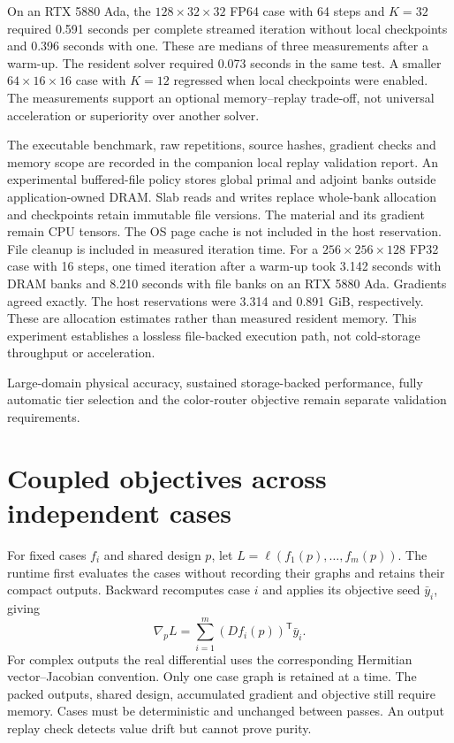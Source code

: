 \documentclass[11pt,a4paper]{article}
\begin{document}
On an RTX 5880 Ada, the $128\times32\times32$ FP64 case with 64 steps and
$K=32$ required 0.591 seconds per complete streamed iteration without local
checkpoints and 0.396 seconds with one. These are medians of three measurements
after a warm-up. The resident solver required 0.073 seconds in the same test.
A smaller $64\times16\times16$ case with $K=12$ regressed when local checkpoints
were enabled. The measurements support an optional memory--replay trade-off,
not universal acceleration or superiority over another solver.

The executable benchmark, raw repetitions, source hashes, gradient checks and
memory scope are recorded in the companion local replay validation report.
An experimental buffered-file policy stores global primal and adjoint banks
outside application-owned DRAM. Slab reads and writes replace whole-bank
allocation and checkpoints retain immutable file versions. The material and
its gradient remain CPU tensors. The OS page cache is not included in the host
reservation. File cleanup is included in measured iteration time.
For a $256\times256\times128$ FP32 case with 16 steps, one timed iteration
after a warm-up took 3.142 seconds with DRAM banks and 8.210 seconds with file
banks on an RTX 5880 Ada. Gradients agreed exactly. The host reservations were
3.314 and 0.891 GiB, respectively. These are allocation estimates rather than
measured resident memory. This experiment establishes a lossless file-backed
execution path, not cold-storage throughput or acceleration.

Large-domain physical accuracy, sustained storage-backed performance, fully
automatic tier selection and the color-router objective remain separate
validation requirements.

\section{Coupled objectives across independent cases}
For fixed cases $f_i$ and shared design $p$, let
$L=\ell(f_1(p),\ldots,f_m(p))$. The runtime first evaluates the cases
without recording their graphs and retains their compact outputs. Backward
recomputes case $i$ and applies its objective seed $\bar y_i$, giving
\[
\nabla_p L=\sum_{i=1}^{m} (D f_i(p))^{\mathsf T}\bar y_i.
\]
For complex outputs the real differential uses the corresponding Hermitian
vector--Jacobian convention. Only one case graph is retained at a time.
The packed outputs, shared design, accumulated gradient and objective still
require memory. Cases must be deterministic and unchanged between passes.
An output replay check detects value drift but cannot prove purity.
\end{document}
